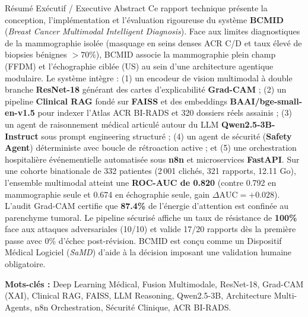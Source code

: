 \documentclass[11pt,a4paper]{article}
\begin{document}
\begin{titlepage}
\begin{center}
\vspace{1.2cm}

\begin{techhighlight}{Résumé Exécutif / Executive Abstract}
Ce rapport technique présente la conception, l'implémentation et l'évaluation rigoureuse du système \textbf{BCMID} (\textit{Breast Cancer Multimodal Intelligent Diagnosis}). Face aux limites diagnostiques de la mammographie isolée (masquage en seins denses ACR C/D et taux élevé de biopsies bénignes $>70\%$), BCMID associe la mammographie plein champ (FFDM) et l'échographie ciblée (US) au sein d'une architecture agentique modulaire. Le système intègre :
(1) un encodeur de vision multimodal à double branche \textbf{ResNet-18} générant des cartes d'explicabilité \textbf{Grad-CAM} ;
(2) un pipeline \textbf{Clinical RAG} fondé sur \textbf{FAISS} et des embeddings \textbf{BAAI/bge-small-en-v1.5} pour indexer l'Atlas ACR BI-RADS et 320 dossiers réels assainis ;
(3) un agent de raisonnement médical articulé autour du LLM \textbf{Qwen2.5-3B-Instruct} sous prompt engineering structuré ;
(4) un agent de sécurité (\textbf{Safety Agent}) déterministe avec boucle de rétroaction active ; et
(5) une orchestration hospitalière événementielle automatisée sous \textbf{n8n} et microservices \textbf{FastAPI}.
Sur une cohorte binationale de 332 patientes (2\,001 clichés, 321 rapports, 12.11 Go), l'ensemble multimodal atteint une \textbf{ROC-AUC de 0.820} (contre 0.792 en mammographie seule et 0.674 en échographie seule, gain $\Delta\text{AUC} = +0.028$). L'audit Grad-CAM certifie que \textbf{87.4\%} de l'énergie d'attention est confinée au parenchyme tumoral. Le pipeline sécurisé affiche un taux de résistance de \textbf{100\%} face aux attaques adversariales (10/10) et valide 17/20 rapports dès la première passe avec 0\% d'échec post-révision. BCMID est conçu comme un Dispositif Médical Logiciel (\textit{SaMD}) d'aide à la décision imposant une validation humaine obligatoire.
\end{techhighlight}

\vspace{0.8cm}
\textbf{Mots-clés :} Deep Learning Médical, Fusion Multimodale, ResNet-18, Grad-CAM (XAI), Clinical RAG, FAISS, LLM Reasoning, Qwen2.5-3B, Architecture Multi-Agents, n8n Orchestration, Sécurité Clinique, ACR BI-RADS.

\end{center}
\end{titlepage}

\tableofcontents
\newpage
\end{document}
